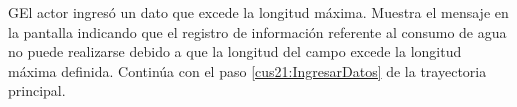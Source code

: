     \begin{UCtrayectoriaA}{G}{El actor ingresó un dato que excede la longitud máxima.}    
    \UCpaso[\UCsist] Muestra el mensaje  en la pantalla  indicando que el registro de información referente al consumo de agua no puede realizarse debido a que la longitud del campo excede la longitud máxima definida.
    \UCpaso[] Continúa con el paso \ref{cus21:IngresarDatos} de la trayectoria principal.     
    \end{UCtrayectoriaA}